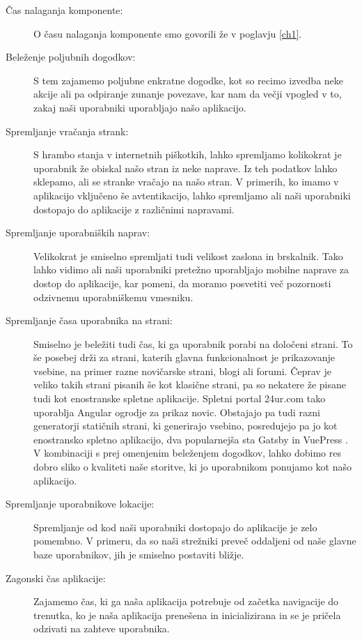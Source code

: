 \documentclass[a4paper, 12pt]{book}
\begin{document}
\begin{description}
	\item[Čas nalaganja komponente:] O času nalaganja komponente smo govorili že v poglavju \ref{ch1}.
	\item[Beleženje poljubnih dogodkov:] S tem zajamemo poljubne enkratne dogodke, kot so recimo izvedba neke akcije ali pa odpiranje zunanje povezave, kar nam da večji vpogled v to, zakaj naši uporabniki uporabljajo našo aplikacijo.
	\item[Spremljanje vračanja strank:] S hrambo stanja v internetnih piškotkih, lahko spremljamo kolikokrat je uporabnik že obiskal našo stran iz neke naprave. Iz teh podatkov lahko sklepamo,  ali se stranke vračajo na našo stran. V primerih, ko imamo v aplikacijo vključeno še avtentikacijo, lahko spremljamo ali naši uporabniki dostopajo do aplikacije z različnimi napravami.
	\item[Spremljanje uporabniških naprav:] Velikokrat je smiselno spremljati tudi velikost zaslona in brskalnik. Tako lahko vidimo ali naši uporabniki pretežno uporabljajo mobilne naprave za dostop do aplikacije, kar pomeni, da moramo posvetiti več pozornosti odzivnemu uporabniškemu vmesniku.
	\item[Spremljanje časa uporabnika na strani:] Smiselno je beležiti tudi čas, ki ga uporabnik porabi na določeni strani. To še posebej drži za strani, katerih glavna funkcionalnost je prikazovanje vsebine, na primer razne novičarske strani, blogi ali forumi. Čeprav je veliko takih strani pisanih še kot klasične strani, pa so nekatere že pisane tudi kot enostranske spletne aplikacije. Spletni portal 24ur.com tako uporablja Angular ogrodje za prikaz novic. Obstajajo pa tudi razni generatorji statičnih strani, ki generirajo vsebino, posredujejo pa jo kot enostransko spletno aplikacijo, dva popularnejša sta Gatsby \cite{gatsby_website} in VuePress \cite{vuepress_website}. V kombinaciji s prej omenjenim beleženjem dogodkov, lahko dobimo res dobro sliko o kvaliteti naše storitve, ki jo uporabnikom ponujamo kot našo aplikacijo.
	\item[Spremljanje uporabnikove lokacije:] Spremljanje od kod naši uporabniki dostopajo do aplikacije je zelo pomembno. V primeru, da so naši strežniki preveč oddaljeni od naše glavne baze uporabnikov, jih je smiselno postaviti bližje.
	\item[Zagonski čas aplikacije:] Zajamemo čas, ki ga naša aplikacija potrebuje od začetka navigacije do trenutka, ko je naša aplikacija prenešena in inicializirana in se je pričela odzivati na zahteve uporabnika.

\end{description}
\end{document}

